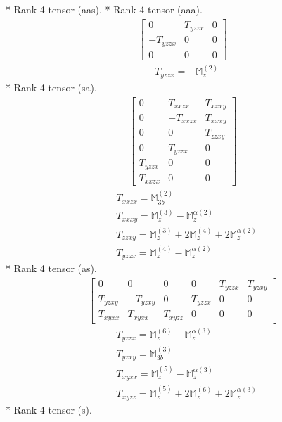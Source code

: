 \documentclass[fleqn,8pt,landscape]{jsarticle}
\begin{document}
* Rank 4 tensor (aas).
* Rank 4 tensor (aaa).
\begin{align*}
\begin{bmatrix} 0 & T_{yzzx} & 0 \\ - T_{yzzx} & 0 & 0 \\ 0 & 0 & 0 \end{bmatrix}
\end{align*}
\begin{align*}
& T_{yzzx} = - \mathbb{M}_{z}^{(2)}
\end{align*}
* Rank 4 tensor (sa).
\begin{align*}
\begin{bmatrix} 0 & T_{xxzx} & T_{xxxy} \\ 0 & - T_{xxzx} & T_{xxxy} \\ 0 & 0 & T_{zzxy} \\ 0 & T_{yzzx} & 0 \\ T_{yzzx} & 0 & 0 \\ T_{xxzx} & 0 & 0 \end{bmatrix}
\end{align*}
\begin{align*}
& T_{xxzx} = \mathbb{M}_{3b}^{(2)} \\
& T_{xxxy} = \mathbb{M}_{z}^{(3)} - \mathbb{M}_{z}^{\alpha(2)} \\
& T_{zzxy} = \mathbb{M}_{z}^{(3)} + 2 \mathbb{M}_{z}^{(4)} + 2 \mathbb{M}_{z}^{\alpha(2)} \\
& T_{yzzx} = \mathbb{M}_{z}^{(4)} - \mathbb{M}_{z}^{\alpha(2)}
\end{align*}
* Rank 4 tensor (as).
\begin{align*}
\begin{bmatrix} 0 & 0 & 0 & 0 & T_{yzzx} & T_{yzxy} \\ T_{yzxy} & - T_{yzxy} & 0 & T_{yzzx} & 0 & 0 \\ T_{xyxx} & T_{xyxx} & T_{xyzz} & 0 & 0 & 0 \end{bmatrix}
\end{align*}
\begin{align*}
& T_{yzzx} = \mathbb{M}_{z}^{(6)} - \mathbb{M}_{z}^{\alpha(3)} \\
& T_{yzxy} = \mathbb{M}_{3b}^{(3)} \\
& T_{xyxx} = \mathbb{M}_{z}^{(5)} - \mathbb{M}_{z}^{\alpha(3)} \\
& T_{xyzz} = \mathbb{M}_{z}^{(5)} + 2 \mathbb{M}_{z}^{(6)} + 2 \mathbb{M}_{z}^{\alpha(3)}
\end{align*}
* Rank 4 tensor (s).
\end{document}
